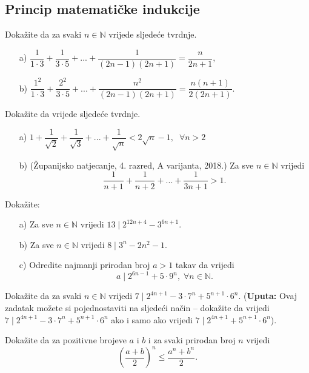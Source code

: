 \subsection*{Princip matematičke indukcije}
\begin{exercise}
Dokažite da za svaki $n\in \mathbb{N}$ vrijede sljedeće tvrdnje.
\begin{itemize}
\item[a)] $\dfrac{1}{1\cdot 3}+\dfrac{1}{3\cdot 5}+...+\dfrac{1}{(2n-1)(2n+1)}=\dfrac{n}{2n+1},$
\item[b)] $\dfrac{1^2}{1\cdot 3}+\dfrac{2^2}{3\cdot 5}+... +\dfrac{n^2}{(2n-1)(2n+1)}=\dfrac{n(n+1)}{2(2n+1)}.$
\end{itemize}
\end{exercise}
\begin{exercise}
\label{nejedn}
Dokažite da vrijede sljedeće tvrdnje.
\begin{itemize}
\item[a)] $1+\dfrac{1}{\sqrt{2}}+\dfrac{1}{\sqrt{3}}+...+\dfrac{1}{\sqrt{n}}<2\sqrt{n}-1, \; \; \forall n>2$
\item[b)] (Županijsko natjecanje, 4. razred, A varijanta, 2018.) Za sve $n\in \mathbb{N}$ vrijedi $$\dfrac{1}{n+1}+\dfrac{1}{n+2}+...+\dfrac{1}{3n+1}>1.$$
\end{itemize}
\end{exercise}
\begin{exercise}
Dokažite:
\begin{itemize}
\item[a)] Za sve $n\in \mathbb{N}$ vrijedi $13 \; |\; 2^{12n+4}-3^{6n+1}$.
\item[b)] Za sve $n\in \mathbb{N}$ vrijedi $8\; |\; 3^n-2n^2-1$.
\item[c)] Odredite najmanji prirodan broj $a>1$ takav da vrijedi
$$a \mid 2^{6n-1}+5\cdot 9^n,\; \forall n\in \mathbb{N}.$$
\end{itemize}
\end{exercise}
\begin{exercise}
Dokažite da za svaki $n\in \mathbb{N}$ vrijedi $7 \; |\; 2^{4n+1}-3\cdot 7^n+5^{n+1}\cdot 6^n$. (\textbf{Uputa:} Ovaj zadatak možete si pojednostaviti na sljedeći način -- dokažite da vrijedi $7 \; |\; 2^{4n+1}-3\cdot 7^n+5^{n+1}\cdot 6^n$ ako i samo ako vrijedi $7 \; |\; 2^{4n+1}+5^{n+1}\cdot 6^n$).
\end{exercise}
\begin{exercise}
Dokažite da za pozitivne brojeve $a$ i $b$ i za svaki prirodan broj $n$ vrijedi
$$\left(\dfrac{a+b}{2}\right)^n\leq \dfrac{a^n+b^n}{2}.$$
\end{exercise}
